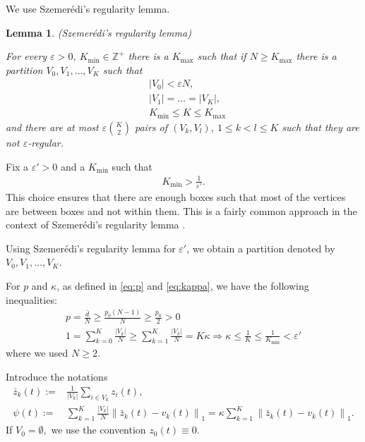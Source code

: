 \documentclass{article}
\newcommand{\1}[1]{{\mathds{1}}_{\left\{#1\right\}}}
\newtheorem*{lemma*}{Lemma}
\begin{document}
	We use Szemer\'edi's regularity lemma.
	\begin{lemma*}(Szemer\'edi's regularity lemma)
		
		For every $\varepsilon>0, \ K_{\min} \in \mathbb{Z}^{+}$ there is a $K_{\max}$ such that if $N\geq K_{\max}$ there is a partition $V_{0}, V_{1}, \dots, V_{K}$ such that
		\begin{align*}
			&\left|V_0 \right| <\varepsilon N,\\
			& \left|V_1 \right|= \dots =\left| V_K \right|, \\
			& K_{\min} \leq K \leq K_{\max}
		\end{align*}
		and there are at most $\varepsilon {K \choose 2 }$ pairs of $\left(V_{k},V_{l}\right), \ 1 \leq k <l \leq K$ such that they are not $\varepsilon$-regular.
	\end{lemma*}	
	
	Fix a $\varepsilon'>0$ and a $K_{\min}$ such that
	\begin{align*}
		K_{\min}>\frac{1}{\varepsilon'}.
	\end{align*}
	This choice ensures that there are enough boxes such that most of the vertices are between boxes and not within them. This is a fairly common approach in the context of Szemer\'edi's regularity lemma \cite{Szemeredi}.
	
	Using Szemer\'edi's regularity lemma for $\varepsilon'$, we obtain a partition denoted by $V_0,V_1, \dots, V_K.$
	
	For $p$ and $\kappa$, as defined in \eqref{eq:p} and \eqref{eq:kappa}, we have the following inequalities:
	\begin{align*}
		p=\frac{\bar{d}}{N} \geq \frac{p_0(N-1)}{N} \geq \frac{p_0}{2}>0\\
		1= \sum_{k=0}^{K}\frac{\left|V_k \right|}{N} \geq \sum_{k=1}^{K}\frac{\left|V_k \right|}{N}=K \kappa \Longrightarrow\kappa \leq  \frac{1}{K} \leq \frac{1}{K_{\min}}<\varepsilon'
	\end{align*}
	where we used $N\geq 2$.
	
	Introduce the notations
	\begin{align*}
		\bar{z}_{k}(t):=&\frac{1}{\left|V_k \right|}\sum_{i \in V_k} z_{i}(t),\\
		\psi(t):=&\sum_{k=1}^{K} \frac{\left|V_k \right|}{N}\left \|\bar{z}_{k}(t)-v_k(t) \right \|_1=\kappa \sum_{k=1}^{K} \left \|\bar{z}_{k}(t)-v_k(t) \right \|_1.
	\end{align*}
	If $V_0=\emptyset,$ we use the convention $z_{0}(t) \equiv 0.$
	
\end{document}
